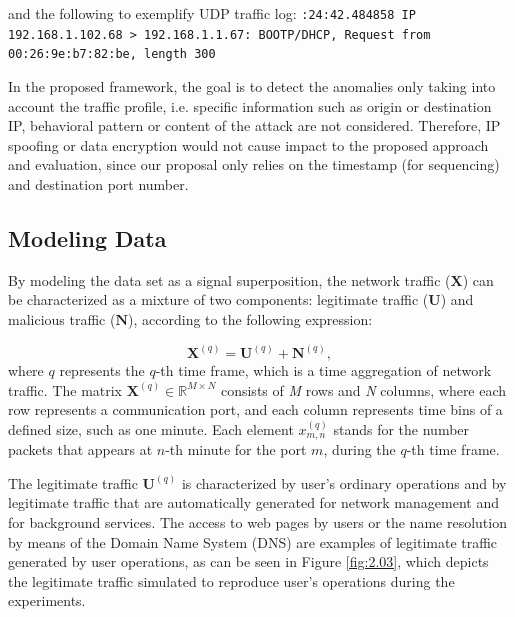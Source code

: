 and the following to exemplify UDP traffic log: 
\newline
\newline
\texttt{:24:42.484858 IP 192.168.1.102.68 > 192.168.1.1.67: BOOTP/DHCP, Request from 00:26:9e:b7:82:be, length 300}
\newline 

In the proposed framework, the goal is to detect the anomalies only taking into account the traffic profile, i.e. specific information such as origin or destination IP, behavioral pattern or content of the attack are not considered. Therefore, IP spoofing or data encryption would not cause impact to the proposed approach and evaluation, since our proposal only relies on the timestamp (for sequencing) and destination port number.

\subsection{Modeling Data}
\label{sec:2_ModelingData}

By modeling the data set as a signal superposition, the network traffic ($\pmb{X}$) can be characterized as a mixture of two components: legitimate traffic ($\pmb{U}$) and malicious traffic ($\pmb{N}$), according to the following expression:

\begin{equation}\label{eq:2.01}
	\pmb{X}^{(q)} = \pmb{U}^{(q)} + \pmb{N}^{(q)},
\end{equation}
where $q$ represents the $q$-th time frame, which is a time aggregation of network traffic. The matrix $\pmb{X}^{(q)} \in \mathbb{R}^{M \times N}$ consists of \emph{M} rows and \emph{N} columns, where each row represents a communication port, and each column represents time bins of a defined size, such as one minute. Each element $x_{m,n}^{(q)}$ stands for the number packets that appears at $n$-th minute for the port $m$, during the $q$-th time frame.

The legitimate traffic $\pmb{U}^{(q)}$ is characterized by user's ordinary operations and by legitimate traffic that are automatically generated for network management and for background services. The access to web pages by users or the name resolution by means of the Domain Name System (DNS) are examples of legitimate traffic generated by user operations, as can be seen in Figure \ref{fig:2.03}, which depicts the legitimate traffic simulated to reproduce user's operations during the experiments.

